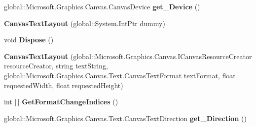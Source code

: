 \begin{DoxyCompactItemize}
\mbox{\label{class_microsoft_1_1_graphics_1_1_canvas_1_1_text_1_1_canvas_text_layout_a63c18a3a380f4b86c17dc06ce7c426e1}} 
global\+::\+Microsoft.\+Graphics.\+Canvas.\+Canvas\+Device {\bfseries get\+\_\+\+Device} ()
\item 
\mbox{\label{class_microsoft_1_1_graphics_1_1_canvas_1_1_text_1_1_canvas_text_layout_aa0d12016b1d9631abf94ebe95eca05a0}} 
{\bfseries Canvas\+Text\+Layout} (global\+::\+System.\+Int\+Ptr dummy)
\item 
\mbox{\label{class_microsoft_1_1_graphics_1_1_canvas_1_1_text_1_1_canvas_text_layout_a7d35b539c782a63cef76d60d771100b9}} 
void {\bfseries Dispose} ()
\item 
\mbox{\label{class_microsoft_1_1_graphics_1_1_canvas_1_1_text_1_1_canvas_text_layout_a3e6e6ee905c4e104025e259714b4f387}} 
{\bfseries Canvas\+Text\+Layout} (global\+::\+Microsoft.\+Graphics.\+Canvas.\+I\+Canvas\+Resource\+Creator resource\+Creator, string text\+String, global\+::\+Microsoft.\+Graphics.\+Canvas.\+Text.\+Canvas\+Text\+Format text\+Format, float requested\+Width, float requested\+Height)
\item 
\mbox{\label{class_microsoft_1_1_graphics_1_1_canvas_1_1_text_1_1_canvas_text_layout_a3a21e6cfe852ee1c03c9ae0f65349cbe}} 
int \mbox{[}$\,$\mbox{]} {\bfseries Get\+Format\+Change\+Indices} ()
\item 
\mbox{\label{class_microsoft_1_1_graphics_1_1_canvas_1_1_text_1_1_canvas_text_layout_acf787c5c52efb0a761fd5fa779c0b7a6}} 
global\+::\+Microsoft.\+Graphics.\+Canvas.\+Text.\+Canvas\+Text\+Direction {\bfseries get\+\_\+\+Direction} ()
\item 
\mbox{\label{class_microsoft_1_1_graphics_1_1_canvas_1_1_text_1_1_canvas_text_layout_a73aa648a92dd6826fcda1869c17dd35d}} 

\end{DoxyCompactItemize}
